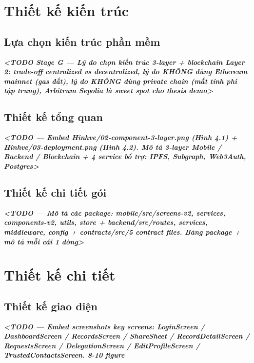 \documentclass[../DoAn]{subfiles}
\begin{document}

\section{Thiết kế kiến trúc}

\subsection{Lựa chọn kiến trúc phần mềm}
\textit{\textbf{<TODO Stage G — Lý do chọn kiến trúc 3-layer + blockchain Layer 2: trade-off centralized vs decentralized, lý do KHÔNG dùng Ethereum mainnet (gas đắt), lý do KHÔNG dùng private chain (mất tính phi tập trung), Arbitrum Sepolia là sweet spot cho thesis demo>}}

\subsection{Thiết kế tổng quan}
\textit{\textbf{<TODO — Embed Hinhve/02-component-3-layer.png (Hình 4.1) + Hinhve/03-deployment.png (Hình 4.2). Mô tả 3-layer Mobile / Backend / Blockchain + 4 service bổ trợ: IPFS, Subgraph, Web3Auth, Postgres>}}

\subsection{Thiết kế chi tiết gói}
\textit{\textbf{<TODO — Mô tả các package: mobile/src/{screens-v2, services, components-v2, utils, store} + backend/src/{routes, services, middleware, config} + contracts/src/{5 contract files}. Bảng package + mô tả mỗi cái 1 dòng>}}

\section{Thiết kế chi tiết}

\subsection{Thiết kế giao diện}
\textit{\textbf{<TODO — Embed screenshots key screens: LoginScreen / DashboardScreen / RecordsScreen / ShareSheet / RecordDetailScreen / RequestsScreen / DelegationScreen / EditProfileScreen / TrustedContactsScreen. 8-10 figure}}
\end{document}
